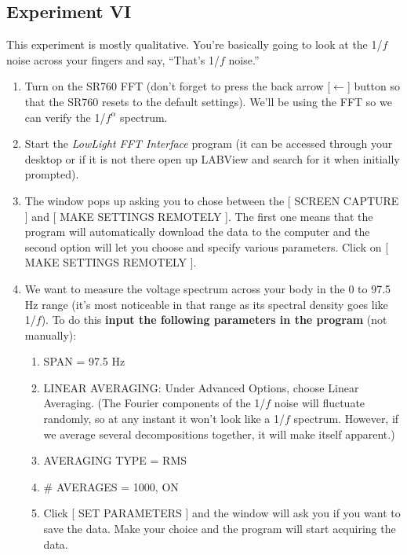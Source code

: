 \documentclass{../lab}
\begin{document}
\subsection{Experiment VI}

This experiment is mostly qualitative. You're basically going to look at the 1/$f$ noise across your fingers and say, ``That's 1/$f$ noise.''

\begin{enumerate}
    \item Turn on the SR760 FFT (don't forget to press the back arrow [$\leftarrow$] button so that the SR760 resets to the default settings). We'll be using the FFT so we can verify the 1/$f^\alpha$ spectrum.

    \item Start the \emph{LowLight FFT Interface} program (it can be accessed through your desktop or if it is not there open up LABView and search for it when initially prompted).

    \item The window pops up asking you to chose between the [ SCREEN CAPTURE ] and [ MAKE SETTINGS REMOTELY ]. The first one means that the program will automatically download the data to the computer and the second option will let you choose and specify various parameters. Click on [ MAKE SETTINGS REMOTELY ].

    \item We want to measure the voltage spectrum across your body in the 0 to 97.5 Hz range (it's most noticeable in that range as its spectral density goes like 1/$f$). To do this \textbf{input the following parameters in the program} (not manually):
    \begin{enumerate}
        \item SPAN = 97.5 Hz

        \item LINEAR AVERAGING: Under Advanced Options, choose Linear Averaging. (The Fourier components of the 1/$f$ noise will fluctuate randomly, so at any instant it won't look like a 1/$f$ spectrum. However, if we average several decompositions together, it will make itself apparent.)

        \item AVERAGING TYPE = RMS

        \item \# AVERAGES = 1000, ON

        \item Click [ SET PARAMETERS ] and the window will ask you if you want to save the data. Make your choice and the program will start acquiring the data.


\end{enumerate}
\end{enumerate}
\end{document}
